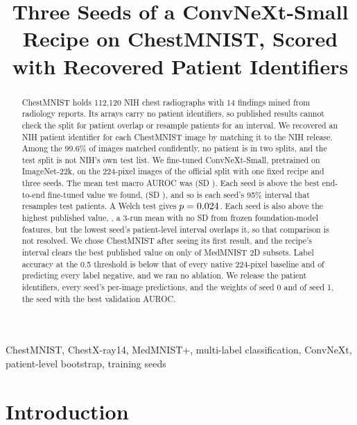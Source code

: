 \documentclass[conference]{IEEEtran}
\begin{document}
\title{Three Seeds of a ConvNeXt-Small Recipe on ChestMNIST, Scored with Recovered Patient Identifiers}

\author{
}

\maketitle

\begin{abstract}
ChestMNIST holds 112,120 NIH chest radiographs with 14 findings mined from radiology
reports. Its arrays carry no patient identifiers, so published results cannot check the
split for patient overlap or resample patients for an interval. We recovered an NIH patient
identifier for each ChestMNIST image by matching it to the NIH release. Among the 99.6\% of
images matched confidently, no patient is in two splits, and the test split is not NIH's
own test list. We fine-tuned ConvNeXt-Small, pretrained on ImageNet-22k, on the 224-pixel
images of the official split with one fixed recipe and three seeds. The mean test macro
AUROC was \testAurocMean{} (SD \testAurocSD{}). Each seed is above the best end-to-end
fine-tuned value we found, \baseWuAuroc{} (SD \baseWuSD{}), and so is each seed's 95\%
interval that resamples test patients. A Welch test gives $p=0.024{}$. Each seed is
also above the highest published value, \baseBestAuroc{}, a 3-run mean with no SD from
frozen foundation-model features, but the lowest seed's patient-level interval overlaps
it, so that comparison is not resolved. We chose ChestMNIST after seeing its first result,
and the recipe's interval clears the best published value on only \subsetsAbove{} of
\subsetsTotal{} MedMNIST 2D subsets. Label accuracy at the 0.5 threshold is below that of every
native 224-pixel baseline and of predicting every label negative, and we ran no ablation. We release the patient
identifiers, every seed's per-image predictions, and the weights of seed 0 and of seed 1, the seed with the best validation AUROC.
\end{abstract}

\begin{IEEEkeywords}
ChestMNIST, ChestX-ray14, MedMNIST+, multi-label classification, ConvNeXt, patient-level
bootstrap, training seeds
\end{IEEEkeywords}

\section{Introduction}
\end{document}
